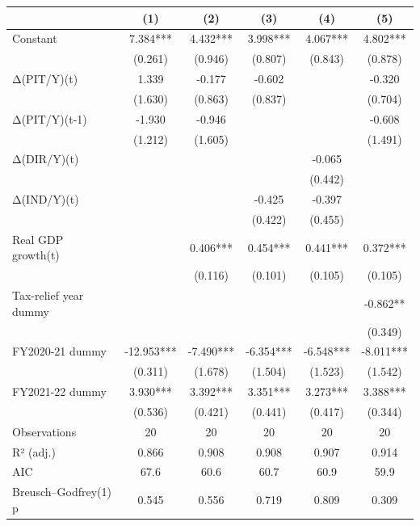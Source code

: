 \begin{tabular}{lccccc}
\toprule
 & (1) & (2) & (3) & (4) & (5) \\
\midrule
Constant & 7.384*** & 4.432*** & 3.998*** & 4.067*** & 4.802*** \\
   & (0.261) & (0.946) & (0.807) & (0.843) & (0.878) \\
Δ(PIT/Y)(t) & 1.339 & -0.177 & -0.602 &  & -0.320 \\
     & (1.630) & (0.863) & (0.837) &  & (0.704) \\
Δ(PIT/Y)(t-1) & -1.930 & -0.946 &  &  & -0.608 \\
       & (1.212) & (1.605) &  &  & (1.491) \\
Δ(DIR/Y)(t) &  &  &  & -0.065 &  \\
         &  &  &  & (0.442) &  \\
Δ(IND/Y)(t) &  &  & -0.425 & -0.397 &  \\
           &  &  & (0.422) & (0.455) &  \\
Real GDP growth(t) &  & 0.406*** & 0.454*** & 0.441*** & 0.372*** \\
             &  & (0.116) & (0.101) & (0.105) & (0.105) \\
Tax-relief year dummy &  &  &  &  & -0.862** \\
               &  &  &  &  & (0.349) \\
FY2020-21 dummy & -12.953*** & -7.490*** & -6.354*** & -6.548*** & -8.011*** \\
                 & (0.311) & (1.678) & (1.504) & (1.523) & (1.542) \\
FY2021-22 dummy & 3.930*** & 3.392*** & 3.351*** & 3.273*** & 3.388*** \\
                   & (0.536) & (0.421) & (0.441) & (0.417) & (0.344) \\
Observations & 20 & 20 & 20 & 20 & 20 \\
R² (adj.) & 0.866 & 0.908 & 0.908 & 0.907 & 0.914 \\
AIC & 67.6 & 60.6 & 60.7 & 60.9 & 59.9 \\
Breusch–Godfrey(1) p & 0.545 & 0.556 & 0.719 & 0.809 & 0.309 \\
\bottomrule
\end{tabular}
